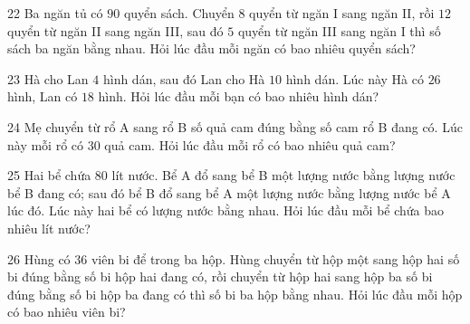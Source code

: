 \gap
\begin{probbox}{22}{\relax}
Ba ngăn tủ có $90$ quyển sách. Chuyển $8$ quyển từ ngăn I sang ngăn II, rồi $12$ quyển từ ngăn II sang ngăn III, sau đó $5$ quyển từ ngăn III sang ngăn I thì số sách ba ngăn bằng nhau. Hỏi lúc đầu mỗi ngăn có bao nhiêu quyển sách?
\end{probbox}
\gap
\begin{probbox}{23}{\relax}
Hà cho Lan $4$ hình dán, sau đó Lan cho Hà $10$ hình dán. Lúc này Hà có $26$ hình, Lan có $18$ hình. Hỏi lúc đầu mỗi bạn có bao nhiêu hình dán?
\end{probbox}
\gap
\begin{probbox}{24}{\relax}
Mẹ chuyển từ rổ A sang rổ B số quả cam đúng bằng số cam rổ B đang có. Lúc này mỗi rổ có $30$ quả cam. Hỏi lúc đầu mỗi rổ có bao nhiêu quả cam?
\end{probbox}
\gap
\begin{probbox}{25}{\relax}
Hai bể chứa $80$ lít nước. Bể A đổ sang bể B một lượng nước bằng lượng nước bể B đang có; sau đó bể B đổ sang bể A một lượng nước bằng lượng nước bể A lúc đó. Lúc này hai bể có lượng nước bằng nhau. Hỏi lúc đầu mỗi bể chứa bao nhiêu lít nước?
\end{probbox}
\gap
\begin{probbox}{26}{\relax}
Hùng có $36$ viên bi để trong ba hộp. Hùng chuyển từ hộp một sang hộp hai số bi đúng bằng số bi hộp hai đang có, rồi chuyển từ hộp hai sang hộp ba số bi đúng bằng số bi hộp ba đang có thì số bi ba hộp bằng nhau. Hỏi lúc đầu mỗi hộp có bao nhiêu viên bi?
\end{probbox}
